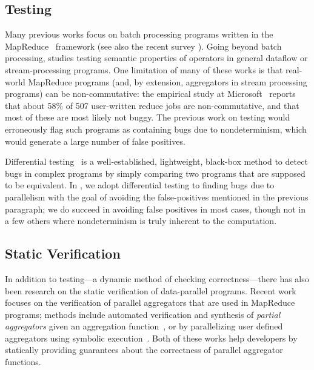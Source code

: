 \subsection{Testing}

Many previous works focus on batch processing programs written in the MapReduce~\cite{dean2008mapreduce} framework \cite{csallner2011new,xu2013semantic,marynowski2012testing,chen2016commutativity} (see also the recent survey \cite{moran2019testing}). Going beyond batch processing, \cite{xu2013testing} studies testing semantic properties of operators in general dataflow or stream-processing programs.
One limitation of many of these works \cite{csallner2011new,xu2013semantic,xu2013testing,chen2016commutativity} is that real-world MapReduce programs (and, by extension, aggregators in stream processing programs) can be non-commutative: the empirical study at Microsoft~\cite{xiao2014nondeterminism} reports that about 58\% of 507 user-written reduce jobs are non-commutative, and that most of these are most likely not buggy. The previous work on testing would erroneously flag such programs as containing bugs due to nondeterminism, which would generate a large number of false positives.

Differential testing~\cite{mckeeman1998differential,groce2007randomized} is a well-established, lightweight, black-box method to detect bugs in complex programs by simply comparing two programs that are supposed to be equivalent.
In , we adopt differential testing to finding bugs due to parallelism with the goal of avoiding the false-positives mentioned in the previous paragraph; we do succeed in avoiding false positives in most cases, though not in a few others where nondeterminism is truly inherent to the computation.

\subsection{Static Verification}

In addition to testing---a dynamic method of checking
correctness---there has also been research on the static verification
of data-parallel programs. Recent work focuses on the verification of
parallel aggregators that are used in MapReduce programs; methods include automated verification and synthesis of \emph{partial
aggregators} given an aggregation function~\cite{liu2014automating},
or by parallelizing user defined aggregators using symbolic
execution~\cite{raychev2015parallelizing}. Both of these works help
developers by statically providing guarantees about the correctness of
parallel aggregator functions.

